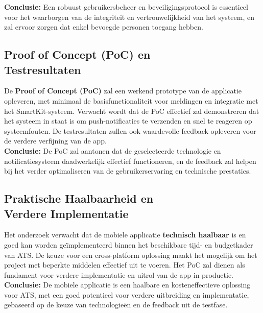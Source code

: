 \noindent \textbf{Conclusie:} Een robuust gebruikersbeheer en beveiligingsprotocol is essentieel voor het waarborgen van de integriteit en vertrouwelijkheid van het systeem, en zal ervoor zorgen dat enkel bevoegde personen toegang hebben.

\subsection{Proof of Concept (PoC) en \\Testresultaten}
\noindent De \textbf{Proof of Concept (PoC)} zal een werkend prototype van de applicatie opleveren, met minimaal de basisfunctionaliteit voor meldingen en integratie met het SmartKit-systeem. Verwacht wordt dat de PoC effectief zal demonstreren dat het systeem in staat is om push-notificaties te verzenden en snel te reageren op systeemfouten. De testresultaten zullen ook waardevolle feedback opleveren voor de verdere verfijning van de app. \\


\noindent \textbf{Conclusie:} De PoC zal aantonen dat de geselecteerde technologie en notificatiesysteem daadwerkelijk effectief functioneren, en de feedback zal helpen bij het verder optimaliseren van de gebruikerservaring en technische prestaties.

\subsection{Praktische Haalbaarheid en \\Verdere Implementatie}
\noindent Het onderzoek verwacht dat de mobiele applicatie \textbf{technisch haalbaar} is en goed kan worden geïmplementeerd binnen het beschikbare tijd- en budgetkader van ATS. De keuze voor een cross-platform oplossing maakt het mogelijk om het project met beperkte middelen effectief uit te voeren. Het PoC zal dienen als fundament voor verdere implementatie en uitrol van de app in productie. \\


\noindent \textbf{Conclusie:} De mobiele applicatie is een haalbare en kosteneffectieve oplossing voor ATS, met een goed potentieel voor verdere uitbreiding en implementatie, gebaseerd op de keuze van technologieën en de feedback uit de testfase.


